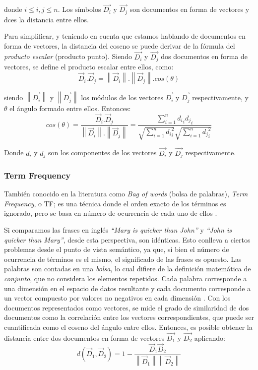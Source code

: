donde \(i \leq i,j \leq n\). Los símbolos \(\overrightarrow{D_i}\) y \(\overrightarrow{D_j}\) son documentos en forma de vectores y dces la distancia entre ellos.

\bigskip Para simplificar, y teniendo en cuenta que estamos hablando de documentos en forma de vectores, la distancia del coseno se puede derivar de la fórmula del \textit{producto escalar} (producto punto). Siendo \(\overrightarrow{D_i}\) y \(\overrightarrow{D_j}\) dos documentos en forma de vectores, se define el producto escalar entre ellos, como:
\[\vec{D}_i.\vec{D}_j = \left \| \vec{D}_i \right \|.\left \| \vec{D}_j \right \|.cos(\theta)\]

siendo \(\left \|\overrightarrow{D_i}\right \|\) y \(\left \|\overrightarrow{D_j}\right \|\) los módulos de los vectores \(\overrightarrow{D_i}\) y \(\overrightarrow{D_j}\) respectivamente, y $\theta$ el ángulo formado entre ellos. Entonces:
\[cos(\theta) = \frac{\vec{D}_i.\vec{D}_j}{\left \| \vec{D}_i \right \|.\left \| \vec{D}_j \right \|}=\frac{\sum_{i=1}^{n}{{d_i}_i{d_j}_i}}{\sqrt{\sum_{i=1}^{n}{{d_i}_i^{2}}}\sqrt{\sum_{i=1}^{n}{{d_j}_i^{2}}}}\]

Donde \(d_i\) y \(d_j\) son los componentes de los vectores \(\overrightarrow{D_i}\) y \(\overrightarrow{D_j}\) respectivamente.

\subsubsection{Term Frequency}
También conocido en la literatura como \textit{Bag of words} (bolsa de palabras), \textit{Term Frequency}, o TF; es una técnica donde el orden exacto de los términos es ignorado, pero se basa en número de ocurrencia de cada uno de ellos \citep{christopher2008introduction}.

\bigskip Si comparamos las frases en inglés \textit{“Mary is quicker than John”} y \textit{“John is quicker than Mary”}, desde esta perspectiva, son idénticas. Esto conlleva a ciertos problemas desde el punto de vista semántico, ya que, si bien el número de ocurrencia de términos es el mismo, el significado de las frases es opuesto. Las palabras son contadas en una \textit{bolsa}, lo cual difiere de la definición matemática de \textit{conjunto}, que no considera los elementos repetidos. Cada palabra corresponde a una dimensión en el espacio de datos resultante y cada documento corresponde a un vector compuesto por valores no negativos en cada dimensión \citep{huang2008similarity}. Con los documentos representados como vectores, se mide el grado de similaridad de dos documentos como la correlación entre los vectores correspondientes, que puede ser cuantificada como el coseno del ángulo entre ellos. Entonces, es posible obtener la distancia entre dos documentos en forma de vectores \(\overrightarrow{D_1}\) y \(\overrightarrow{D_2}\) aplicando:
\[d(\vec{D}_1, \vec{D}_2) = 1 - \frac{\vec{D}_1 \vec{D}_2}{\left \| \vec{D}_1 \right\| \left \| \vec{D}_2 \right\|}\]

